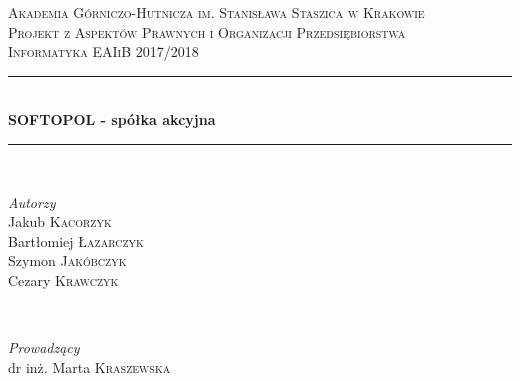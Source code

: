 \documentclass[11pt]{article}
\begin{document}
	
	\begin{titlepage} 
	
		\newcommand{\HRule}{\rule{\linewidth}{0.5mm}} %
		
		\center %
		
		
		\textsc{\LARGE Akademia Górniczo-Hutnicza im. Stanisława Staszica w Krakowie}\\[1.5cm] %
		
		\textsc{\Large Projekt z Aspektów Prawnych i Organizacji Przedsiębiorstwa}\\[0.5cm] %
		
		\textsc{\large Informatyka EAIiB 2017/2018}\\[0.5cm] %
		
		
		\HRule\\[0.4cm]
		
		{\huge\bfseries SOFTOPOL - spółka akcyjna}\\[0.4cm] %
		
		\HRule\\[1.5cm]
		
		
		\begin{minipage}{0.4\textwidth}
			\begin{flushleft}
				\large
				\textit{Autorzy}\\
				Jakub \textsc{Kacorzyk} \\
				Bartłomiej \textsc{Łazarczyk} \\
				Szymon \textsc{Jakóbczyk} \\
				Cezary \textsc{Krawczyk} 
			\end{flushleft}
		\end{minipage}
		~
		\begin{minipage}{0.4\textwidth}
			\begin{flushright}
				\large
				\textit{Prowadzący}\\
				dr inż. Marta \textsc{Kraszewska} %
			\end{flushright}
		\end{minipage}
		

\end{titlepage}
\end{document}
